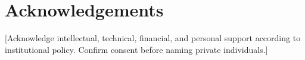\chapter*{Acknowledgements}

[Acknowledge intellectual, technical, financial, and personal support according
to institutional policy. Confirm consent before naming private individuals.]
